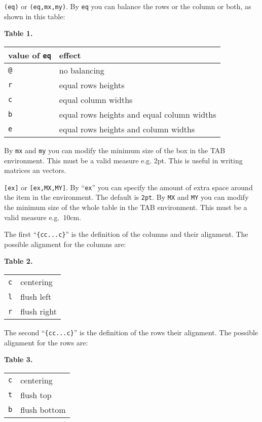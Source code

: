 \documentclass[a4paper]{article}
\begin{document}
\begin{dotlist}
  \item
  \verb'(eq)' or \verb'(eq,mx,my)'.  By \verb'eq' you can balance
  the rows or the column or both, as shown in this table:
  \begin{center}
    \textbf{Table 1.}\nobreak\\[1em]
    \begin{tabular}{|l|l|}
      \hline
      value of \verb|eq| & effect \\
      \hline
      \verb'@' & no balancing \\
      \verb'r' & equal rows heights \\
      \verb'c' & equal column widths  \\
      \verb'b' & equal rows heights and equal column widths \\
      \verb'e' & equal rows heights and column widths \\
      \hline
    \end{tabular}
  \end{center}
  By \verb'mx' and \verb'my' you can modify the minimum size of the
  box in the TAB environment.  This must be a valid measure e.g. 2pt. 
  This is useful in writing matrices an vectors.
  \item
  \verb'[ex]' or \verb'[ex,MX,MY]'.  By ``\verb'ex''' you can specify
  the amount of extra space around the item in the 
  environment.  The default is \verb'2pt'.  By \verb'MX' and \verb'MY'
  you can modify the minimum size of the whole table in the TAB
  environment.  This must be a valid measure e.g.~10cm.
  \item
  The first ``\verb'{cc...c}''' is the definition of the columns and
  their alignment.  The possible alignment for the columns are:
  \begin{center}
    \textbf{Table 2.} \nobreak\\[1em]
    \begin{tabular}{|l|l|}
      \hline
      \verb'c' & centering \\
      \verb'l' & flush left \\
      \verb'r' & flush right \\
      \hline
    \end{tabular}
  \end{center}
  \item
  The second ``\verb'{cc...c}''' is the definition of the rows their
  alignment.  The possible alignment for the rows are:
  \begin{center}
    \textbf{Table 3.} \\[1em]
    \begin{tabular}{|l|l|}
      \hline
      \verb'c' & centering \\
      \verb't' & flush top \\
      \verb'b' & flush bottom \\
      \hline
    \end{tabular}
  \end{center}
\end{dotlist}
\end{document}
